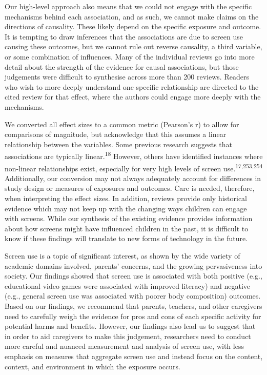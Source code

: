 \documentclass[
  english,
  man]{apa6}
\begin{document}
Our high-level approach also means that we could not engage with the specific mechanisms behind each association, and as such, we cannot make claims on the directions of causality.
These likely depend on the specific exposure and outcome.
It is tempting to draw inferences that the associations are due to screen use causing these outcomes, but we cannot rule out reverse causality, a third variable, or some combination of influences.
Many of the individual reviews go into more detail about the strength of the evidence for causal associations, but those judgements were difficult to synthesise across more than 200 reviews.
Readers who wish to more deeply understand one specific relationship are directed to the cited review for that effect, where the authors could engage more deeply with the mechanisms.

We converted all effect sizes to a common metric (Pearson's r) to allow for comparisons of magnitude, but acknowledge that this assumes a linear relationship between the variables.
Some previous research suggests that associations are typically linear.\textsuperscript{18}
However, others have identified instances where non-linear relationships exist, especially for very high levels of screen use.\textsuperscript{17,253,254}
Additionally, our conversion may not always adequately account for differences in study design or measures of exposures and outcomes.
Care is needed, therefore, when interpreting the effect sizes.
In addition, reviews provide only historical evidence which may not keep up with the changing ways children can engage with screens.
While our synthesis of the existing evidence provides information about how screens might have influenced children in the past, it is difficult to know if these findings will translate to new forms of technology in the future.

Screen use is a topic of significant interest, as shown by the wide variety of academic domains involved, parents' concerns, and the growing pervasiveness into society.
Our findings showed that screen use is associated with both positive (e.g., educational video games were associated with improved literacy) and negative (e.g., general screen use was associated with poorer body composition) outcomes.
Based on our findings, we recommend that parents, teachers, and other caregivers need to carefully weigh the evidence for pros and cons of each specific activity for potential harms and benefits.
However, our findings also lead us to suggest that in order to aid caregivers to make this judgement, researchers need to conduct more careful and nuanced measurement and analysis of screen use, with less emphasis on measures that aggregate screen use and instead focus on the content, context, and environment in which the exposure occurs.
\end{document}
